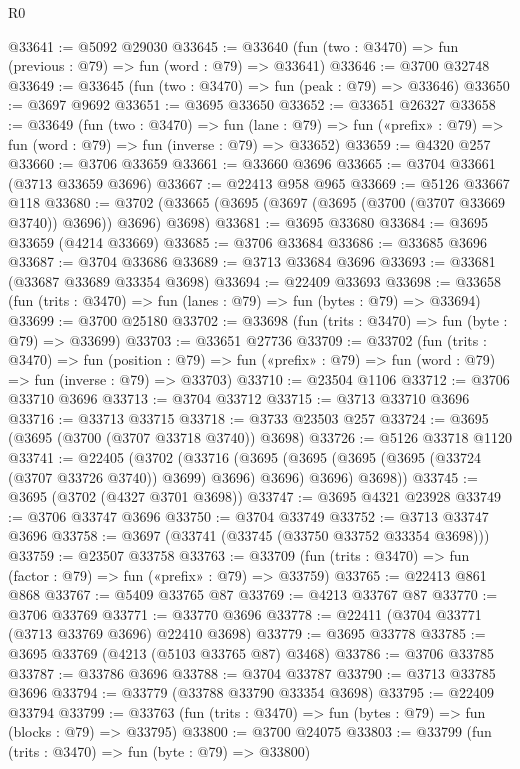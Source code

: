 \begin{lexlean}{R0}
\begin{coremodule}
@33641 := @5092 @29030
@33645 := @33640 (fun (two : @3470) => fun (previous : @79) => fun (word : @79) => @33641)
@33646 := @3700 @32748
@33649 := @33645 (fun (two : @3470) => fun (peak : @79) => @33646)
@33650 := @3697 @9692
@33651 := @3695 @33650
@33652 := @33651 @26327
@33658 := @33649
    (fun (two : @3470) =>
    fun (lane : @79) => fun («prefix» : @79) => fun (word : @79) => fun (inverse : @79) => @33652)
@33659 := @4320 @257
@33660 := @3706 @33659
@33661 := @33660 @3696
@33665 := @3704 @33661 (@3713 @33659 @3696)
@33667 := @22413 @958 @965
@33669 := @5126 @33667 @118
@33680 := @3702 (@33665 (@3695 (@3697 (@3695 (@3700 (@3707 @33669 @3740)) @3696)) @3696) @3698)
@33681 := @3695 @33680
@33684 := @3695 @33659 (@4214 @33669)
@33685 := @3706 @33684
@33686 := @33685 @3696
@33687 := @3704 @33686
@33689 := @3713 @33684 @3696
@33693 := @33681 (@33687 @33689 @33354 @3698)
@33694 := @22409 @33693
@33698 := @33658 (fun (trits : @3470) => fun (lanes : @79) => fun (bytes : @79) => @33694)
@33699 := @3700 @25180
@33702 := @33698 (fun (trits : @3470) => fun (byte : @79) => @33699)
@33703 := @33651 @27736
@33709 := @33702
    (fun (trits : @3470) =>
    fun (position : @79) =>
    fun («prefix» : @79) => fun (word : @79) => fun (inverse : @79) => @33703)
@33710 := @23504 @1106
@33712 := @3706 @33710 @3696
@33713 := @3704 @33712
@33715 := @3713 @33710 @3696
@33716 := @33713 @33715
@33718 := @3733 @23503 @257
@33724 := @3695 (@3695 (@3700 (@3707 @33718 @3740)) @3698)
@33726 := @5126 @33718 @1120
@33741 := @22405
    (@3702
      (@33716
        (@3695 (@3695 (@3695 (@3695 (@33724 (@3707 @33726 @3740)) @3699) @3696) @3696) @3696)
        @3698))
@33745 := @3695 (@3702 (@4327 @3701 @3698))
@33747 := @3695 @4321 @23928
@33749 := @3706 @33747 @3696
@33750 := @3704 @33749
@33752 := @3713 @33747 @3696
@33758 := @3697 (@33741 (@33745 (@33750 @33752 @33354 @3698)))
@33759 := @23507 @33758
@33763 := @33709 (fun (trits : @3470) => fun (factor : @79) => fun («prefix» : @79) => @33759)
@33765 := @22413 @861 @868
@33767 := @5409 @33765 @87
@33769 := @4213 @33767 @87
@33770 := @3706 @33769
@33771 := @33770 @3696
@33778 := @22411 (@3704 @33771 (@3713 @33769 @3696) @22410 @3698)
@33779 := @3695 @33778
@33785 := @3695 @33769 (@4213 (@5103 @33765 @87) @3468)
@33786 := @3706 @33785
@33787 := @33786 @3696
@33788 := @3704 @33787
@33790 := @3713 @33785 @3696
@33794 := @33779 (@33788 @33790 @33354 @3698)
@33795 := @22409 @33794
@33799 := @33763 (fun (trits : @3470) => fun (bytes : @79) => fun (blocks : @79) => @33795)
@33800 := @3700 @24075
@33803 := @33799 (fun (trits : @3470) => fun (byte : @79) => @33800)

\end{coremodule}
\end{lexlean}
